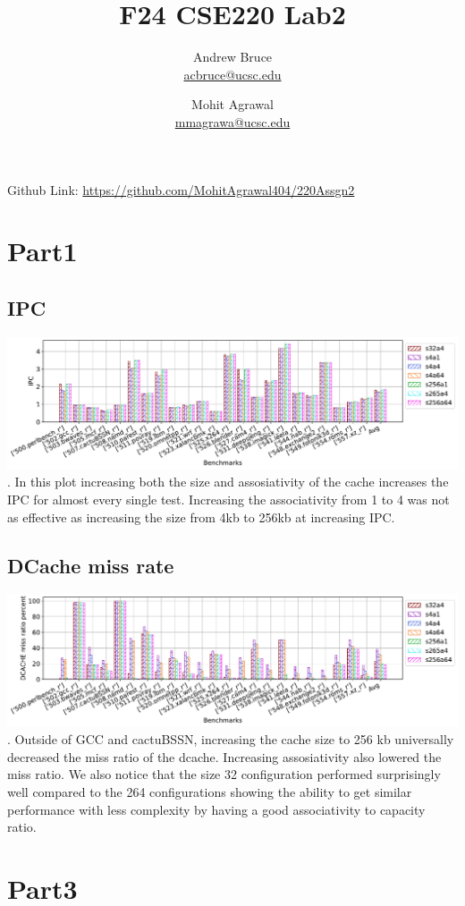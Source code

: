 \documentclass{article}
\title{F24 CSE220 Lab2}
\author{
  Andrew Bruce \\ \href{mailto:acbruce@ucsc.edu}{acbruce@ucsc.edu} \and
  Mohit Agrawal \\ \href{mailto:mmagrawa@ucsc.edu}{mmagrawa@ucsc.edu}
}
\begin{document}
\maketitle
Github Link: \url{https://github.com/MohitAgrawal404/220Assgn2 }

\section*{Part1}
\subsection*{IPC}
\includegraphics[width=\textwidth]{Part1/IPC.pdf}.
In this plot increasing both the size and assosiativity of the cache increases the IPC for almost every single test. Increasing the associativity from 1 to 4 was not as effective as increasing the size from 4kb to 256kb at increasing IPC.
\subsection*{DCache miss rate}
\includegraphics[width=\textwidth]{Part1/DCACHE.pdf}.
Outside of GCC and cactuBSSN, increasing the cache size to 256 kb universally decreased the miss ratio of the dcache. Increasing assosiativity also lowered the miss ratio. We also notice that the size 32 configuration performed surprisingly well compared to the 264 configurations showing the ability to get similar performance with less complexity by having a good associativity to capacity ratio. 
\section*{Part3}
\end{document}
